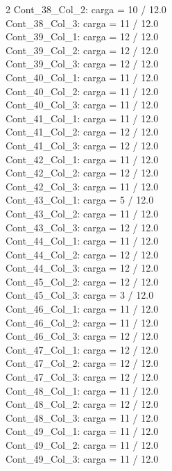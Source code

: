 \begin{multicols}{2}
Cont\_38\_Col\_2: carga = 10 / 12.0\\
Cont\_38\_Col\_3: carga = 11 / 12.0\\
Cont\_39\_Col\_1: carga = 12 / 12.0\\
Cont\_39\_Col\_2: carga = 12 / 12.0\\
Cont\_39\_Col\_3: carga = 12 / 12.0\\
Cont\_40\_Col\_1: carga = 11 / 12.0\\
Cont\_40\_Col\_2: carga = 11 / 12.0\\
Cont\_40\_Col\_3: carga = 11 / 12.0\\
Cont\_41\_Col\_1: carga = 11 / 12.0\\
Cont\_41\_Col\_2: carga = 12 / 12.0\\
Cont\_41\_Col\_3: carga = 12 / 12.0\\
Cont\_42\_Col\_1: carga = 11 / 12.0\\
Cont\_42\_Col\_2: carga = 12 / 12.0\\
Cont\_42\_Col\_3: carga = 11 / 12.0\\
Cont\_43\_Col\_1: carga = 5 / 12.0\\
Cont\_43\_Col\_2: carga = 11 / 12.0\\
Cont\_43\_Col\_3: carga = 12 / 12.0\\
Cont\_44\_Col\_1: carga = 11 / 12.0\\
Cont\_44\_Col\_2: carga = 12 / 12.0\\
Cont\_44\_Col\_3: carga = 12 / 12.0\\
Cont\_45\_Col\_2: carga = 12 / 12.0\\
Cont\_45\_Col\_3: carga = 3 / 12.0\\
Cont\_46\_Col\_1: carga = 11 / 12.0\\
Cont\_46\_Col\_2: carga = 11 / 12.0\\
Cont\_46\_Col\_3: carga = 12 / 12.0\\
Cont\_47\_Col\_1: carga = 12 / 12.0\\
Cont\_47\_Col\_2: carga = 12 / 12.0\\
Cont\_47\_Col\_3: carga = 12 / 12.0\\
Cont\_48\_Col\_1: carga = 11 / 12.0\\
Cont\_48\_Col\_2: carga = 12 / 12.0\\
Cont\_48\_Col\_3: carga = 11 / 12.0\\
Cont\_49\_Col\_1: carga = 11 / 12.0\\
Cont\_49\_Col\_2: carga = 11 / 12.0\\
Cont\_49\_Col\_3: carga = 11 / 12.0\\

\end{multicols}
